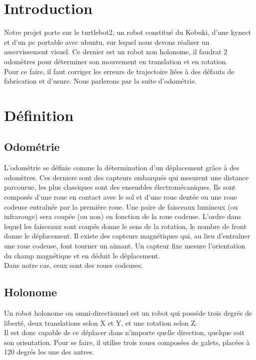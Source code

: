 \documentclass[12pt,french]{article}
\begin{document}
\section{Introduction}

Notre projet porte sur le turtlebot2, un robot constitué du Kobuki, d'une kynect et d'un pc portable avec ubuntu, sur lequel nous devons réaliser un asservissement visuel. Ce dernier est un robot non holonome, il faudrat 2 odomètres pour déterminer son mouvement en translation et en rotation. \\

Pour ce faire, il faut corriger les erreurs de trajectoire liées à des défauts de fabrication et d'usure. Nous parlerons par la suite d'odométrie.

\section{Définition}

\subsection{Odométrie}
L’odomètrie se définie comme la détermination d’un déplacement grâce à des odomètres. Ces derniers sont des capteurs embarqués qui mesurent une distance parcourue, les plus classiques sont des ensembles électromécaniques. Ils sont composés d’une roue en contact avec le sol et d’une roue dentée ou une roue codeuse entraînée par la première roue. Une paire de faisceaux lumineux (ou infrarouge) sera coupée (ou non) en fonction de la roue codeuse. L’ordre dans lequel les faisceaux sont coupés donne le sens de la rotation, le nombre de front donne le déplacement.
Il existe des capteurs magnétiques qui, au lieu d’entraîner une roue codeuse, font tourner un aimant. Un capteur fixe mesure l’orientation du champ magnétique et en déduit le déplacement.\\
Dans notre cas, ceux sont des roues codeuses.\\

\subsection{Holonome}
Un robot holonome ou omni-directionnel est un robot qui posséde trois degrés de liberté, deux translations selon X et Y, et une rotation selon Z. \\
Il est donc capable de ce déplacer dans n'importe quelle direction, quelque soit son orientation. Pour se faire, il utilise trois roues composées de galets, placées à 120 degrés les une des autres.\\
\end{document}
